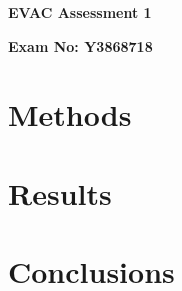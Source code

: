 \documentclass[12pt]{article}
\begin{document}
\setlength{\abovedisplayskip}{2pt}
\setlength{\belowdisplayskip}{2pt}
\setlength{\abovedisplayshortskip}{2pt}
\setlength{\belowdisplayshortskip}{2pt}
\begin{titlepage}
\begin{center}
\vspace*{1cm}
\Huge
\textbf{EVAC Assessment 1}
\vspace{1.5cm}
\Large

\textbf{Exam No: Y3868718}
\vfill
\end{center}
\end{titlepage}
\section{Methods}

\section{Results}

\section{Conclusions}

\pagebreak
\printbibliography
\end{document}
